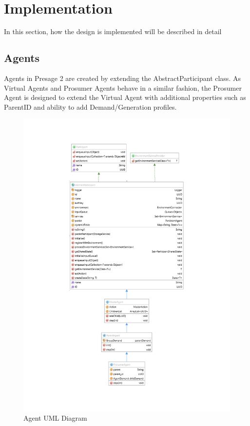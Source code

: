 \chapter{Implementation}
\label{Implementation}
In this section, how the design is implemented will be described in detail

\section*{Agents}
Agents in Presage 2 are created by extending the AbstractParticipant class. As Virtual Agents and Prosumer Agents behave in a similar fashion, the Prosumer Agent is designed to extend the Virtual Agent with additional properties such as ParentID and ability to add Demand/Generation profiles.

\begin{figure}[!h]
	\centering
	\includegraphics[scale=0.71]{Images/AgentUML.png}
	\caption{Agent UML Diagram}
	\label{fig:AgentUML}
\end{figure}

